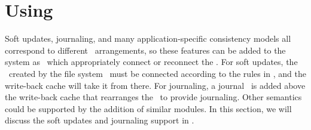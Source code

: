 \section{Using \ChDescs}
\label{sec:using}

Soft updates, journaling, and many application-specific consistency models all
correspond to different \chdesc\ arrangements, so these features can be added to
the system as \modules\ which appropriately connect or reconnect the \chdescs.
For soft updates, the \chdescs\ created by the file system \module\ must be
connected according to the rules in \cite{ganger00soft}, and the write-back
cache will take it from there. For journaling, a journal \module\ is added above
the write-back cache that rearranges the \chdescs\ to provide journaling. Other
semantics could be supported by the addition of similar modules. In this
section, we will discuss the soft updates and journaling support in \Kudos.









